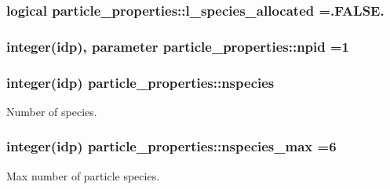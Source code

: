 \subsubsection[{\texorpdfstring{l\+\_\+species\+\_\+allocated}{l_species_allocated}}]{\setlength{\rightskip}{0pt plus 5cm}logical particle\+\_\+properties\+::l\+\_\+species\+\_\+allocated =.F\+A\+L\+S\+E.}\hypertarget{namespaceparticle__properties_a3dcd8fa47e189305bb2534a72c4a8d5c}{}\label{namespaceparticle__properties_a3dcd8fa47e189305bb2534a72c4a8d5c}
\subsubsection[{\texorpdfstring{npid}{npid}}]{\setlength{\rightskip}{0pt plus 5cm}integer(idp), parameter particle\+\_\+properties\+::npid =1}\hypertarget{namespaceparticle__properties_a9a2b5f322610353c06693336b21439f7}{}\label{namespaceparticle__properties_a9a2b5f322610353c06693336b21439f7}
\subsubsection[{\texorpdfstring{nspecies}{nspecies}}]{\setlength{\rightskip}{0pt plus 5cm}integer(idp) particle\+\_\+properties\+::nspecies}\hypertarget{namespaceparticle__properties_a5aabee3c3d0e9e902989125d50e03426}{}\label{namespaceparticle__properties_a5aabee3c3d0e9e902989125d50e03426}


Number of species. 

\subsubsection[{\texorpdfstring{nspecies\+\_\+max}{nspecies_max}}]{\setlength{\rightskip}{0pt plus 5cm}integer(idp) particle\+\_\+properties\+::nspecies\+\_\+max =6}\hypertarget{namespaceparticle__properties_a7f6d8f4edc23a026743320958d14d534}{}\label{namespaceparticle__properties_a7f6d8f4edc23a026743320958d14d534}


Max number of particle species. 

